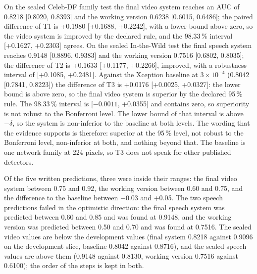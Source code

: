 \documentclass[conference,a4paper]{IEEEtran_nodash}
\begin{document}
On the sealed Celeb-DF family test the final video system reaches an AUC of
0.8218 [0.8020, 0.8393] and the working version 0.6238 [0.6015, 0.6486]; the
paired difference of T1 is +0.1980 [+0.1688, +0.2242], with a lower bound above
zero, so the video system is improved by the declared rule, and the 98.33\,\%
interval [+0.1627, +0.2303] agrees. On the sealed In-the-Wild test the final
speech system reaches 0.9148 [0.8896, 0.9383] and the working version 0.7516
[0.6802, 0.8035]; the difference of T2 is +0.1633 [+0.1177, +0.2266], improved,
with a robustness interval of [+0.1085, +0.2481]. Against the Xception baseline
at $3\times10^{-4}$ (0.8042 [0.7841, 0.8223]) the difference of T3 is +0.0176
[+0.0025, +0.0327]: the lower bound is above zero, so the final video system is
superior by the declared 95\,\% rule. The 98.33\,\% interval is
[$-0.0011$, +0.0355] and contains zero, so superiority is not robust to the
Bonferroni level. The lower bound of that interval is above $-\delta$, so the
system is non-inferior to the baseline at both levels. The wording that the
evidence supports is therefore: superior at the 95\,\% level, not robust to the
Bonferroni level, non-inferior at both, and nothing beyond that. The baseline is
one network family at 224 pixels, so T3 does not speak for other published
detectors. %

Of the five written predictions, three were inside their ranges: the final video
system between 0.75 and 0.92, the working version between 0.60 and 0.75, and the
difference to the baseline between $-0.03$ and +0.05. The two speech
predictions failed in the optimistic direction: the final speech system was
predicted between 0.60 and 0.85 and was found at 0.9148, and the working
version was predicted between 0.50 and 0.70 and was found at 0.7516. The sealed
video values are below the development values (final system 0.8218 against
0.9096 on the development slice, baseline 0.8042 against 0.8716), and the sealed
speech values are above them (0.9148 against 0.8130, working version 0.7516
against 0.6100); the order of the steps is kept in both. %
\end{document}
